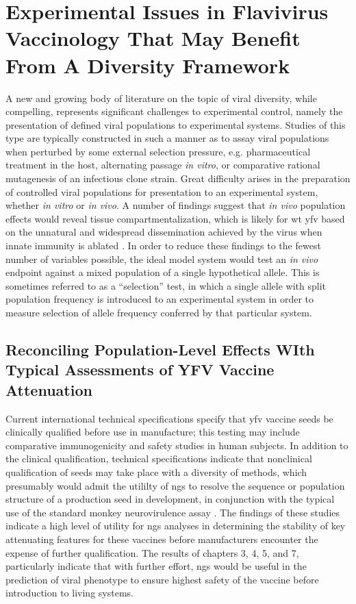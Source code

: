 \section{Experimental Issues in Flavivirus Vaccinology That May Benefit From A Diversity Framework}
A new and growing body of literature on the topic of viral diversity, while compelling, represents significant challenges to experimental control, namely the presentation of defined viral populations to experimental systems. Studies of this type are typically constructed in such a manner as to assay viral populations when perturbed by some external selection pressure, e.g. pharmaceutical treatment in the host, alternating passage \emph{in vitro}, or comparative rational mutagenesis of an infectious clone strain. Great difficulty arises in the preparation of controlled viral populations for presentation to an experimental system, whether \emph{in vitro} or \emph{in vivo}. A number of findings suggest that \emph{in vivo} population effects would reveal tissue compartmentalization, which is likely for \gls{wt} \gls{yfv} based on the unnatural and widespread dissemination achieved by the virus when innate immunity is ablated \parencite{Erickson:2013kv}. In order to reduce these findings to the fewest number of variables possible, the ideal model system would test an \emph{in vivo} endpoint against a mixed population of a single hypothetical allele. This is sometimes referred to as a “selection” test, in which a single allele with split population frequency is introduced to an experimental system in order to measure selection of allele frequency conferred by that particular system.
\subsection{Reconciling Population-Level Effects WIth Typical Assessments of YFV Vaccine Attenuation}
Current international technical specifications specify that \gls{yfv} vaccine seeds be clinically qualified before use in manufacture; this testing may include comparative immunogenicity and safety studies in human subjects. In addition to the clinical qualification, technical specifications indicate that nonclinical qualification of seeds may take place with a diversity of methods, which presumably would admit the utililty of \gls{ngs} to resolve the sequence or population structure of a production seed in development, in conjunction with the typical use of the standard monkey neurovirulence assay \parencite{WorldHealthOrganization:2010wo}. The findings of these studies indicate a high level of utility for \gls{ngs} analyses in determining the stability of key attenuating features for these vaccines before manufacturers encounter the expense of further qualification. The results of chapters 3, 4, 5, and 7, particularly indicate that with further effort, \gls{ngs} would be useful in the prediction of viral phenotype to ensure highest safety of the vaccine before introduction to living systems.


